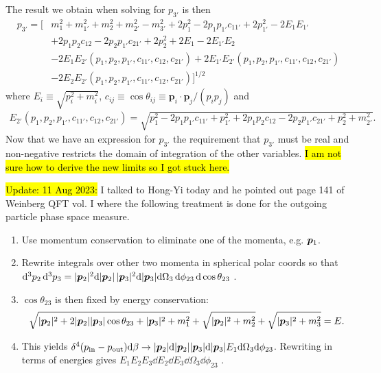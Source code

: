The result we obtain when solving for $p_{3'}$ is then
\begin{equation}
\begin{aligned}
    p_{3'} = 
        \bigg[
            &m_1^2 + m_{1'}^2 + m_2^2 + m_{2'}^2 - m_{3'}^2 + 2 p_{1}^2 - 2 p_{1} p_{1'} c_{11'} + 2 p_{1'}^2 - 2 E_1 E_{1'} \\
            &+ 2 p_1 p_2 c_{12} - 2 p_{2} p_{1'} c_{21'} + 2 p_2^2 + 2 E_1 - 2 E_{1'} E_2 \\
            &- 2 E_1 E_{2'}(p_1, p_{2}, p_{1'}, c_{11'}, c_{12}, c_{21'})
            + 2 E_{1'} E_{2'}(p_1, p_{2}, p_{1'}, c_{11'}, c_{12}, c_{21'})\\
            &- 2 E_2 E_{2'}(p_1, p_{2}, p_{1'}, c_{11'}, c_{12}, c_{21'})
        \bigg]^{1/2}
\end{aligned}
\end{equation}
where $E_i \equiv \sqrt{p_i^2 + m_i^2}$, $c_{ij} \equiv \cos \theta_{ij} \equiv \bm{p}_i \cdot \bm{p}_j / (p_i p_j)$ and 
\begin{align}
    E_{2'}(p_1, p_{2}, p_{1'}, c_{11'}, c_{12}, c_{21'}) = \sqrt{p_1^2  - 2 p_1 p_{1'} c_{11'} + p_{1'}^2  + 2 p_{1} p_{2} c_{12} - 2 p_2 p_{1'} c_{21'} + p_2^2 + m_{2'}^2}.    
\end{align}
Now that we have an expression for $p_{3'}$ the requirement that $p_{3'}$ must be real and non-negative restricts the domain of integration of the other variables. 
\hl{I am not sure how to derive the new limits so I got stuck here.}


\label{subsec:Weinberg}

\hl{Update: 11 Aug 2023:} I talked to Hong-Yi today and he pointed out page 141 of Weinberg QFT vol. I where the following treatment is done for the outgoing particle phase space measure.

\begin{enumerate}
    \item Use momentum conservation to eliminate one of the momenta, e.g. $\pvec[1]$.
    \item Rewrite integrals over other two momenta in spherical polar coords so that $\dd^3 p_2 \, \dd^3 p_3 = \pmag[2]^2 \dd \pmag[2] \, \pmag[3]^2 \dd \pmag[3] \dd \Omega_3 \, \dd \phi_{23} \, \dd \cos \theta_{23}$ .
    \item $\cos \theta_{23}$ is then fixed by energy conservation:
        \begin{align}
            \sqrt{
                \pmag[2]^2 + 2\pmag[2]\pmag[3] \cos \theta_{23} + \pmag[3]^2 + m_1^2
            }
            + \sqrt{\pmag[2]^2 + m_2^2} + \sqrt{\pmag[3]^2 + m_3^2} = E .
        \end{align}
    \item This yields $\delta^4 ( p_{\mathrm{in}} - p_{\mathrm{out}}) \dd \beta \rightarrow \pmag[2] \dd \pmag[2] \pmag[3] \dd \pmag[3] E_1 \dd \Omega_3 \dd \phi_{23}$. Rewriting in terms of energies gives $E_1 E_2 E_3 \dd E_2 \dd E_3 \dd \Omega_{3} \dd \phi_{23}$ .
\end{enumerate}